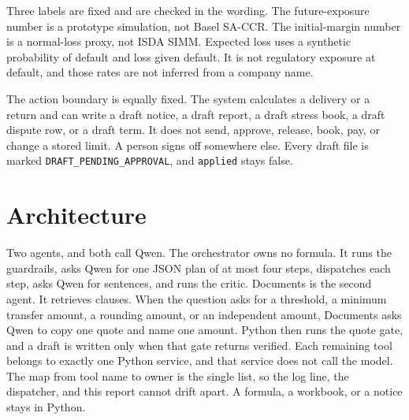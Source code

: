 \documentclass[11pt,a4paper]{article}
\begin{document}
Three labels are fixed and are checked in the wording. The future-exposure number is a prototype simulation, not Basel SA-CCR. The initial-margin number is a normal-loss proxy, not ISDA SIMM. Expected loss uses a synthetic probability of default and loss given default. It is not regulatory exposure at default, and those rates are not inferred from a company name.

The action boundary is equally fixed. The system calculates a delivery or a return and can write a draft notice, a draft report, a draft stress book, a draft dispute row, or a draft term. It does not send, approve, release, book, pay, or change a stored limit. A person signs off somewhere else. Every draft file is marked \texttt{DRAFT\_PENDING\_APPROVAL}, and \texttt{applied} stays false.

\section{Architecture}

Two agents, and both call Qwen. The orchestrator owns no formula. It runs the guardrails, asks Qwen for one JSON plan of at most four steps, dispatches each step, asks Qwen for sentences, and runs the critic. Documents is the second agent. It retrieves clauses. When the question asks for a threshold, a minimum transfer amount, a rounding amount, or an independent amount, Documents asks Qwen to copy one quote and name one amount. Python then runs the quote gate, and a draft is written only when that gate returns verified. Each remaining tool belongs to exactly one Python service, and that service does not call the model. The map from tool name to owner is the single list, so the log line, the dispatcher, and this report cannot drift apart. A formula, a workbook, or a notice stays in Python.
\end{document}

